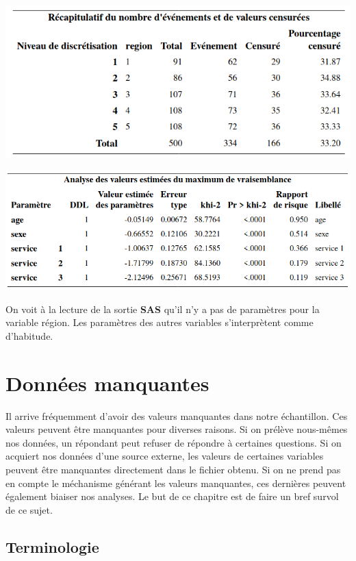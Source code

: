 \documentclass[
  11pt,
  letterpaper,
]{book}
\theoremstyle{definition}
\theoremstyle{definition}
\theoremstyle{definition}
\theoremstyle{definition}
\theoremstyle{remark}
\begin{document}
\begin{center}\includegraphics[width=0.75\linewidth]{figures/05-survie-e31} \end{center}

\begin{center}\includegraphics[width=0.85\linewidth]{figures/05-survie-e32} \end{center}

On voit à la lecture de la sortie \textbf{SAS} qu'il n'y a pas de paramètres pour la variable région. Les paramètres des autres variables s'interprètent comme d'habitude.

\hypertarget{donnees-manquantes}{%
\chapter{Données manquantes}\label{donnees-manquantes}}

Il arrive fréquemment d'avoir des valeurs manquantes dans notre échantillon. Ces valeurs peuvent être manquantes pour diverses raisons. Si on prélève nous-mêmes nos données, un répondant peut refuser de répondre à certaines questions. Si on acquiert nos données d'une source externe, les valeurs de certaines variables peuvent être manquantes directement dans le fichier obtenu. Si on ne prend pas en compte le méchanisme générant les valeurs manquantes, ces dernières peuvent également biaiser nos analyses. Le but de ce chapitre est de faire un bref survol de ce sujet.

\hypertarget{terminologie}{%
\section{Terminologie}\label{terminologie}}
\end{document}
